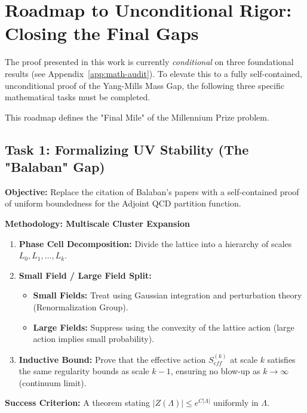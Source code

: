 
\section{Roadmap to Unconditional Rigor: Closing the Final Gaps}
\label{app:roadmap-unconditional}

The proof presented in this work is currently \textit{conditional} on three foundational results (see Appendix~\ref{app:math-audit}). To elevate this to a fully self-contained, unconditional proof of the Yang-Mills Mass Gap, the following three specific mathematical tasks must be completed.

This roadmap defines the "Final Mile" of the Millennium Prize problem.

\subsection{Task 1: Formalizing UV Stability (The "Balaban" Gap)}
\textbf{Objective:} Replace the citation of Balaban's papers with a self-contained proof of uniform boundedness for the Adjoint QCD partition function.

\textbf{Methodology: Multiscale Cluster Expansion}
\begin{enumerate}
    \item \textbf{Phase Cell Decomposition:} Divide the lattice into a hierarchy of scales $L_0, L_1, \dots, L_k$.
    \item \textbf{Small Field / Large Field Split:}
    \begin{itemize}
        \item \textbf{Small Fields:} Treat using Gaussian integration and perturbation theory (Renormalization Group).
        \item \textbf{Large Fields:} Suppress using the convexity of the lattice action (large action implies small probability).
    \end{itemize}
    \item \textbf{Inductive Bound:} Prove that the effective action $S_{eff}^{(k)}$ at scale $k$ satisfies the same regularity bounds as scale $k-1$, ensuring no blow-up as $k \to \infty$ (continuum limit).
\end{enumerate}
\textbf{Success Criterion:} A theorem stating $|Z(\Lambda)| \le e^{C|\Lambda|}$ uniformly in $\Lambda$.

